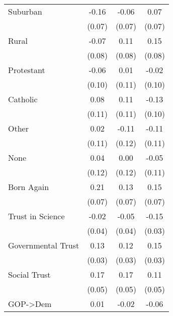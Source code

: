 \begin{table}[htbp]
\begin{tabular}{l*{3}{c}}
Suburban            &       -0.16\sym{*} &       -0.06        &        0.07        \\
                    &      (0.07)        &      (0.07)        &      (0.07)        \\
[1em]
Rural               &       -0.07        &        0.11        &        0.15        \\
                    &      (0.08)        &      (0.08)        &      (0.08)        \\
[1em]
Protestant          &       -0.06        &        0.01        &       -0.02        \\
                    &      (0.10)        &      (0.11)        &      (0.10)        \\
[1em]
Catholic            &        0.08        &        0.11        &       -0.13        \\
                    &      (0.11)        &      (0.11)        &      (0.10)        \\
[1em]
Other               &        0.02        &       -0.11        &       -0.11        \\
                    &      (0.11)        &      (0.12)        &      (0.11)        \\
[1em]
None                &        0.04        &        0.00        &       -0.05        \\
                    &      (0.12)        &      (0.12)        &      (0.11)        \\
[1em]
Born Again          &        0.21\sym{**}&        0.13        &        0.15\sym{*} \\
                    &      (0.07)        &      (0.07)        &      (0.07)        \\
[1em]
Trust in Science    &       -0.02        &       -0.05        &       -0.15\sym{**}\\
                    &      (0.04)        &      (0.04)        &      (0.03)        \\
[1em]
Governmental Trust  &        0.13\sym{**}&        0.12\sym{**}&        0.15\sym{**}\\
                    &      (0.03)        &      (0.03)        &      (0.03)        \\
[1em]
Social Trust        &        0.17\sym{**}&        0.17\sym{**}&        0.11\sym{*} \\
                    &      (0.05)        &      (0.05)        &      (0.05)        \\
[1em]
GOP->Dem            &        0.01        &       -0.02        &       -0.06\sym{**}\\

\end{tabular}
\end{table}

